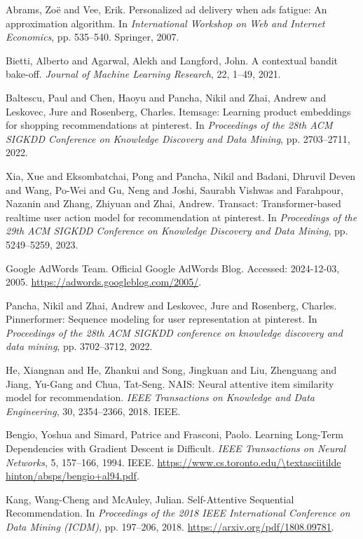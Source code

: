 \begin{thebibliography}{99}
 Abrams, Zo{\"e} and Vee, Erik. {P}ersonalized ad delivery when ads fatigue: {A}n approximation algorithm. In \textit{International Workshop on Web and Internet Economics}, pp. 535--540. Springer, 2007.

 Bietti, Alberto and Agarwal, Alekh and Langford, John. {A} contextual bandit bake-off. \textit{Journal of Machine Learning Research}, 22, 1--49, 2021.

 Baltescu, Paul and Chen, Haoyu and Pancha, Nikil and Zhai, Andrew and Leskovec, Jure and Rosenberg, Charles. {I}temsage: {L}earning product embeddings for shopping recommendations at pinterest. In \textit{Proceedings of the 28th ACM SIGKDD Conference on Knowledge Discovery and Data Mining}, pp. 2703--2711, 2022.

 Xia, Xue and Eksombatchai, Pong and Pancha, Nikil and Badani, Dhruvil Deven and Wang, Po-Wei and Gu, Neng and Joshi, Saurabh Vishwas and Farahpour, Nazanin and Zhang, Zhiyuan and Zhai, Andrew. {T}ransact: {T}ransformer-based realtime user action model for recommendation at pinterest. In \textit{Proceedings of the 29th ACM SIGKDD Conference on Knowledge Discovery and Data Mining}, pp. 5249--5259, 2023.

 Google AdWords Team. {O}fficial {G}oogle {A}dWords {B}log. Accessed: 2024-12-03, 2005. \url{https://adwords.googleblog.com/2005/}.

 Pancha, Nikil and Zhai, Andrew and Leskovec, Jure and Rosenberg, Charles. {P}innerformer: {S}equence modeling for user representation at pinterest. In \textit{Proceedings of the 28th ACM SIGKDD conference on knowledge discovery and data mining}, pp. 3702--3712, 2022.

 He, Xiangnan and He, Zhankui and Song, Jingkuan and Liu, Zhenguang and Jiang, Yu-Gang and Chua, Tat-Seng. N{A}IS: {N}eural attentive item similarity model for recommendation. \textit{IEEE Transactions on Knowledge and Data Engineering}, 30, 2354--2366, 2018. IEEE.

 Bengio, Yoshua and Simard, Patrice and Frasconi, Paolo. {L}earning {L}ong-{T}erm {D}ependencies with {G}radient {D}escent is {D}ifficult. \textit{IEEE Transactions on Neural Networks}, 5, 157--166, 1994. IEEE. \url{https://www.cs.toronto.edu/\textasciitilde hinton/absps/bengio+al94.pdf}.

 Kang, Wang-Cheng and McAuley, Julian. {S}elf-{A}ttentive {S}equential {R}ecommendation. In \textit{Proceedings of the 2018 IEEE International Conference on Data Mining (ICDM)}, pp. 197--206, 2018. \url{https://arxiv.org/pdf/1808.09781}.


\end{thebibliography}

